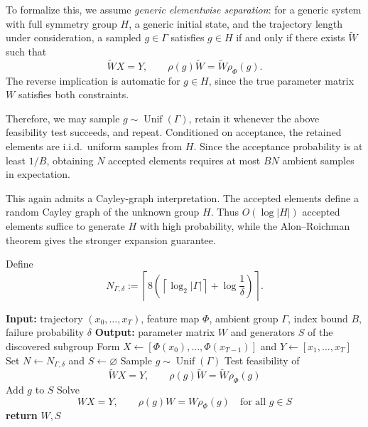 \documentclass[11pt]{article}
\theoremstyle{plain}
\theoremstyle{definition}
\theoremstyle{remark}
\begin{document}
To formalize this, we assume \emph{generic elementwise separation}: for a
generic system with full symmetry group \(H\), a generic initial state, and
the trajectory length under consideration, a sampled \(g\in\Gamma\) satisfies
\(g\in H\) if and only if there exists \(\widetilde W\) such that
\[
\widetilde W X=Y,
\qquad
\rho(g)\widetilde W
=
\widetilde W\rho_\Phi(g).
\]
The reverse implication is automatic for \(g\in H\), since the true parameter
matrix \(W\) satisfies both constraints.

Therefore, we may sample \(g\sim\operatorname{Unif}(\Gamma)\), retain it
whenever the above feasibility test succeeds, and repeat. Conditioned on
acceptance, the retained elements are i.i.d.\ uniform samples from \(H\).
Since the acceptance probability is at least \(1/B\), obtaining \(N\)
accepted elements requires at most \(BN\) ambient samples in expectation.

This again admits a Cayley-graph interpretation. The accepted elements define
a random Cayley graph of the unknown group \(H\). Thus
\(O(\log|H|)\) accepted elements suffice to generate \(H\) with high
probability, while the Alon--Roichman theorem gives the stronger expansion
guarantee.

Define
\[
N_{\Gamma,\delta}
:=
\left\lceil
8\left(
\left\lceil\log_2|\Gamma|\right\rceil
+
\log\frac1\delta
\right)
\right\rceil.
\]

\begin{algorithm}[t]
\caption{Discovery of a bounded-index symmetry group}
\label{alg:bounded_index}
\begin{algorithmic}[1]
\STATE \textbf{Input:} trajectory \((x_0,\ldots,x_T)\), feature map
\(\Phi\), ambient group \(\Gamma\), index bound \(B\), failure probability
\(\delta\)
\STATE \textbf{Output:} parameter matrix \(W\) and generators \(S\) of the
discovered subgroup
\STATE Form
\(X\gets[\Phi(x_0),\ldots,\Phi(x_{T-1})]\) and
\(Y\gets[x_1,\ldots,x_T]\)
\STATE Set \(N\gets N_{\Gamma,\delta}\) and \(S\gets\varnothing\)
    \STATE Sample \(g\sim\operatorname{Unif}(\Gamma)\)
    \STATE Test feasibility of
    \[
    \widetilde W X=Y,
    \qquad
    \rho(g)\widetilde W=\widetilde W\rho_\Phi(g)
    \]
        \STATE Add \(g\) to \(S\)
    \ENDIF
\ENDWHILE
\STATE Solve
\[
WX=Y,
\qquad
\rho(g)W=W\rho_\Phi(g)
\quad\text{for all }g\in S
\]
\STATE \textbf{return} \(W,S\)
\end{algorithmic}
\end{algorithm}
\end{document}
